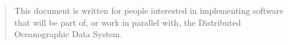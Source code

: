 %
%
%

\small

\begin{quotation}
  This document is written for people interested in implementing software
  that will be part of, or work in parallel with, the Distributed
  Oceanographic Data System. 
\end{quotation}

\normalsize
